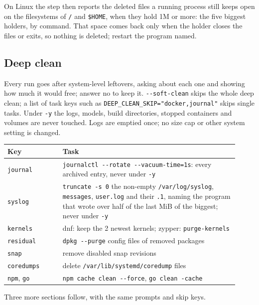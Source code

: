 \documentclass[11pt,a4paper]{article}
\begin{document}
On Linux the step then reports the deleted files a running process
still keeps open on the filesystems of \texttt{/} and
\verb|$HOME|, when they hold 1M or more: the five biggest holders, by
command. That space comes back only when the holder closes the files or
exits, so nothing is deleted; restart the program named.

\subsection{Deep clean}\label{sec:deepclean}
Every run goes after system-level leftovers, asking about each one and
showing how much it would free; answer no to keep it. \texttt{-{}-soft-clean}
skips the whole deep clean; a list of task keys such as
\verb|DEEP_CLEAN_SKIP="docker,journal"| skips single tasks. Under
\texttt{-y} the logs, models, build directories, stopped containers and
volumes are never touched. Logs are emptied once; no size cap or other
system setting is changed.

\begin{longtable}{@{}p{0.22\linewidth} p{0.70\linewidth}@{}}
\toprule
\textbf{Key} & \textbf{Task} \\
\midrule \endhead
\texttt{journal} & \verb|journalctl --rotate --vacuum-time=1s|: every archived entry, never under \texttt{-y} \\
\texttt{syslog} & \texttt{truncate -s 0} the non-empty \verb|/var/log/syslog|, \texttt{messages}, \texttt{user.log} and their \texttt{.1}, naming the program that wrote over half of the last MiB of the biggest; never under \texttt{-y} \\
\texttt{kernels} & dnf: keep the 2 newest kernels; zypper: \texttt{purge-kernels} \\
\texttt{residual} & \texttt{dpkg -{}-purge} config files of removed packages \\
\texttt{snap} & remove disabled snap revisions \\
\texttt{coredumps} & delete \verb|/var/lib/systemd/coredump| files \\
\texttt{npm}, \texttt{go} & \texttt{npm cache clean -{}-force}, \texttt{go clean -cache} \\
\bottomrule
\end{longtable}

Three more sections follow, with the same prompts and skip keys.
\end{document}
